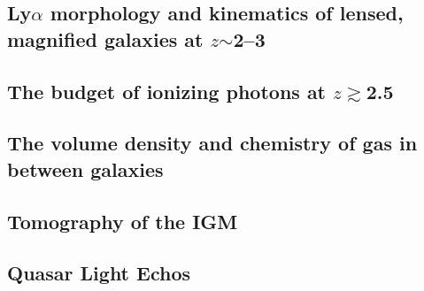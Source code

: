 \noindent{}

\subsection{Ly$\alpha$ morphology and kinematics of lensed, magnified
galaxies at $z$$\sim$2--3}

\noindent{}

\subsection{The budget of ionizing photons at $z$$\gtrsim$2.5}

\noindent{}

\subsection{The volume density and chemistry of gas in between galaxies}

\noindent{}

\subsection{Tomography of the IGM}

\noindent{}

\subsection{Quasar Light Echos} 

\citep{2018arXiv181005156S}



%
%
%
%

